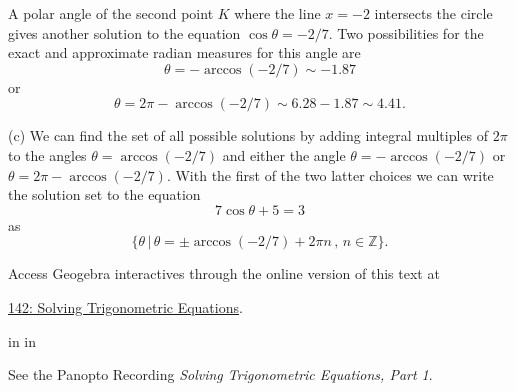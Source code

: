 \documentclass{ximera}
\newcommand{\pskip}{\vskip 0.1 in}
\begin{document}
\begin{example}
\begin{explanation}
A polar angle of the second point $K$ where the line $x=-2$ intersects the circle gives another solution to the equation $\cos\theta = -2/7$. Two possibilities for the exact and approximate radian measures for this angle are
\[
   \theta = -\arccos(-2/7) \sim -1.87 
\]
or 
\[
       \theta = 2\pi - \arccos(-2/7) \sim 6.28 - 1.87 \sim 4.41 .
\]


(c) We can find the set of all possible solutions by adding integral multiples of $2\pi$ to the angles $\theta  =\arccos(-2/7)$ and either the angle $\theta = -\arccos(-2/7)$ or $\theta = 2\pi - \arccos(-2/7)$. With the first of the two latter choices we can write  the solution set to the equation
\[
     7 \cos\theta +5 =  3 
\]
as
\[
     \{  \theta \, | \, \theta = \pm \arccos(-2/7) + 2\pi n \, , \, n \in \mathbb{Z}    \}.
\]
 


Access Geogebra interactives through the online version of this text at
 
\href{https://www.geogebra.org/classic/qnhtd4h8}{142: Solving Trigonometric Equations}.


\end{explanation}


\pskip \pskip

See the Panopto Recording \emph{Solving Trigonometric Equations, Part 1}.


\end{example}
\end{document}
